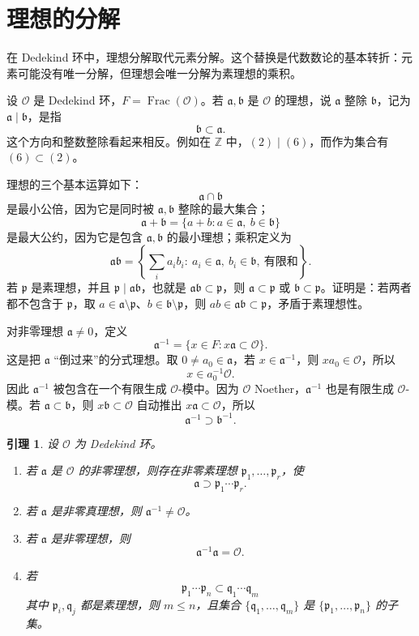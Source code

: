 \documentclass[11pt,a4paper,openany]{ctexbook}
\numberwithin{equation}{chapter}
\newcommand{\Z}{\mathbb{Z}}
\theoremstyle{plain}
\newtheorem{lemma}[theorem]{引理}
\theoremstyle{definition}
\theoremstyle{remark}
\begin{document}
\section{理想的分解}
在 Dedekind 环中，理想分解取代元素分解。这个替换是代数数论的基本转折：元素可能没有唯一分解，但理想会唯一分解为素理想的乘积。

设 $\mathcal O$ 是 Dedekind 环，$F=\operatorname{Frac}(\mathcal O)$。若 $\mathfrak a,\mathfrak b$ 是 $\mathcal O$ 的理想，说 $\mathfrak a$ 整除 $\mathfrak b$，记为 $\mathfrak a\mid\mathfrak b$，是指
\[
\mathfrak b\subset \mathfrak a.
\]
这个方向和整数整除看起来相反。例如在 $\Z$ 中，$(2)\mid(6)$，而作为集合有 $(6)\subset(2)$。

理想的三个基本运算如下：
\[
\mathfrak a\cap\mathfrak b
\]
是最小公倍，因为它是同时被 $\mathfrak a,\mathfrak b$ 整除的最大集合；
\[
\mathfrak a+\mathfrak b=\{a+b:a\in\mathfrak a,\ b\in\mathfrak b\}
\]
是最大公约，因为它是包含 $\mathfrak a,\mathfrak b$ 的最小理想；乘积定义为
\[
\mathfrak a\mathfrak b
=\left\{\sum_i a_i b_i:\ a_i\in\mathfrak a,\ b_i\in\mathfrak b,\ \text{有限和}\right\}.
\]
若 $\mathfrak p$ 是素理想，并且 $\mathfrak p\mid\mathfrak a\mathfrak b$，也就是 $\mathfrak a\mathfrak b\subset\mathfrak p$，则 $\mathfrak a\subset\mathfrak p$ 或 $\mathfrak b\subset\mathfrak p$。证明是：若两者都不包含于 $\mathfrak p$，取 $a\in\mathfrak a\setminus\mathfrak p$、$b\in\mathfrak b\setminus\mathfrak p$，则 $ab\in\mathfrak a\mathfrak b\subset\mathfrak p$，矛盾于素理想性。

对非零理想 $\mathfrak a\ne0$，定义
\[
\mathfrak a^{-1}=\{x\in F:x\mathfrak a\subset\mathcal O\}.
\]
这是把 $\mathfrak a$ “倒过来”的分式理想。取 $0\ne a_0\in\mathfrak a$，若 $x\in\mathfrak a^{-1}$，则 $xa_0\in\mathcal O$，所以
\[
x\in a_0^{-1}\mathcal O.
\]
因此 $\mathfrak a^{-1}$ 被包含在一个有限生成 $\mathcal O$-模中。因为 $\mathcal O$ Noether，$\mathfrak a^{-1}$ 也是有限生成 $\mathcal O$-模。若 $\mathfrak a\subset\mathfrak b$，则 $x\mathfrak b\subset\mathcal O$ 自动推出 $x\mathfrak a\subset\mathcal O$，所以
\[
\mathfrak a^{-1}\supset\mathfrak b^{-1}.
\]

\begin{lemma}
设 $\mathcal O$ 为 Dedekind 环。
\begin{enumerate}[label=(\arabic*)]
\item 若 $\mathfrak a$ 是 $\mathcal O$ 的非零理想，则存在非零素理想 $\mathfrak p_1,\dots,\mathfrak p_r$，使
\[
\mathfrak a\supset \mathfrak p_1\cdots\mathfrak p_r.
\]
\item 若 $\mathfrak a$ 是非零真理想，则 $\mathfrak a^{-1}\ne\mathcal O$。
\item 若 $\mathfrak a$ 是非零理想，则
\[
\mathfrak a^{-1}\mathfrak a=\mathcal O.
\]
\item 若
\[
\mathfrak p_1\cdots\mathfrak p_n\subset \mathfrak q_1\cdots\mathfrak q_m
\]
其中 $\mathfrak p_i,\mathfrak q_j$ 都是素理想，则 $m\le n$，且集合 $\{\mathfrak q_1,\dots,\mathfrak q_m\}$ 是 $\{\mathfrak p_1,\dots,\mathfrak p_n\}$ 的子集。
\end{enumerate}
\end{lemma}
\end{document}
